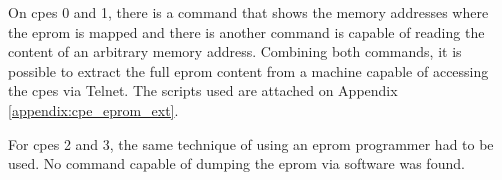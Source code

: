On \glspl{cpe} 0 and 1, there is a command that shows the memory addresses where the \gls{eprom} is mapped and there is another command is capable of reading the content of an arbitrary memory address. Combining both commands, it is possible to extract the full \gls{eprom} content from a machine capable of accessing the \glspl{cpe} via Telnet. The scripts used are attached on Appendix \ref{appendix:cpe_eprom_ext}.

For \glspl{cpe} 2 and 3, the same technique of using an \gls{eprom} programmer had to be used. No command capable of dumping the \gls{eprom} via software was found.

\FloatBarrier

